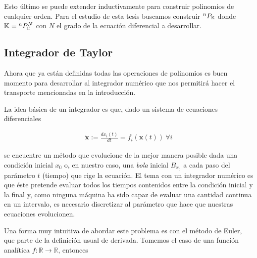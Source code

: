 Esto último se puede extender inductivamente para construir polinomios de cualquier orden. Para el estudio de esta tesis buscamos construir ${^{n}P_{\mathbb{K}}}$ donde $\mathbb{K} = {^{n}P_{\mathbb{C}}^ N }$ con $N$ el grado de la ecuación diferencial a desarrollar.





\subsection{Integrador de Taylor}


Ahora que ya están definidas todas las operaciones de polinomios es buen momento para desarrollar al integrador numérico que nos permitirá hacer el transporte mencionadas en la introducción.

La idea básica de un integrador es que, dado un sistema de ecuaciones diferenciales

\begin{align}
 \dot{\textbf{x}} := \frac{dx_i(t)}{dt} = f_i(\textbf{x}(t)) \ \forall i
 \label{eq: eqdif}
\end{align}

se encuentre un método que evolucione de la mejor manera posible dada una condición inicial $x_0$ o, en nuestro caso, una \textit{bola} inicial $B_{x_0}$ a cada paso del parámetro $t$ (tiempo) que rige la ecuación. El tema con un integrador numérico es que éste pretende evaluar todos los tiempos contenidos entre la condición inicial y la final y, como ninguna máquina ha sido capaz de evaluar una cantidad continua en un intervalo, es necesario discretizar al parámetro que hace que nuestras ecuaciones evolucionen.

Una forma muy intuitiva de abordar este problema es con el método de Euler, que parte de la definición usual de derivada. Tomemos el caso de una función analítica $f: \mathbb{R}  \to \mathbb{R}$, entonces

